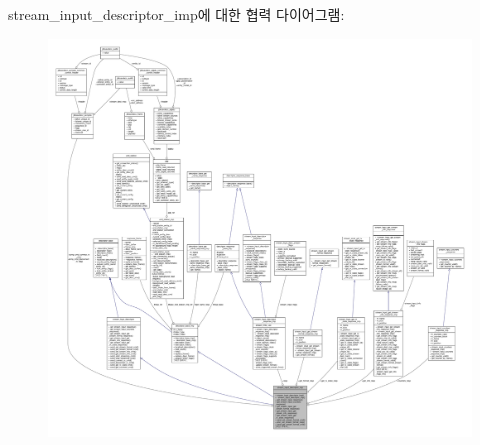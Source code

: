 stream\+\_\+input\+\_\+descriptor\+\_\+imp에 대한 협력 다이어그램\+:
\nopagebreak
\begin{figure}[H]
\begin{center}
\leavevmode
\includegraphics[width=350pt]{classavdecc__lib_1_1stream__input__descriptor__imp__coll__graph}
\end{center}
\end{figure}
